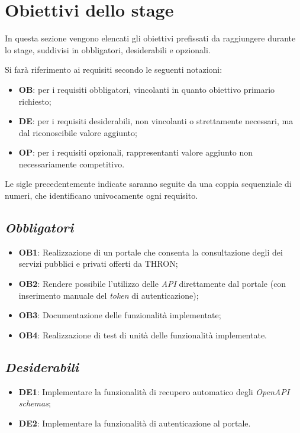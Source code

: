 \section{Obiettivi dello stage}\label{sec:obiettivi-stage}
In questa sezione vengono elencati gli obiettivi prefissati da raggiungere durante lo stage, suddivisi in obbligatori, desiderabili e opzionali.

Si farà riferimento ai requisiti secondo le seguenti notazioni:
\begin{itemize}
    \item \textbf{OB}: per i requisiti obbligatori, vincolanti in quanto obiettivo primario richiesto;
    \item \textbf{DE}: per i requisiti desiderabili, non vincolanti o strettamente necessari, ma dal riconoscibile valore aggiunto;
    \item \textbf{OP}: per i requisiti opzionali, rappresentanti valore aggiunto non necessariamente competitivo.
\end{itemize}
Le sigle precedentemente indicate saranno seguite da una coppia sequenziale di numeri, che identificano univocamente ogni requisito.

\subsection*{\emph{Obbligatori}}\label{subsec:obiettivi-obbligatori}
\begin{itemize}
    \item \textbf{OB1}: Realizzazione di un portale che consenta la consultazione degli  dei servizi pubblici e privati offerti da THRON;
    \item \textbf{OB2}: Rendere possibile l'utilizzo delle \textit{API} direttamente dal portale (con inserimento manuale del \textit{token} di autenticazione);
    \item \textbf{OB3}: Documentazione delle funzionalità implementate;
    \item \textbf{OB4}: Realizzazione di test di unità delle funzionalità implementate.
\end{itemize}

\subsection*{\emph{Desiderabili}}\label{subsec:obiettivi-desiderabili}
\begin{itemize}
    \item \textbf{DE1}: Implementare la funzionalità di recupero automatico degli \textit{OpenAPI schemas};
    \item \textbf{DE2}: Implementare la funzionalità di autenticazione al portale.
\end{itemize}

